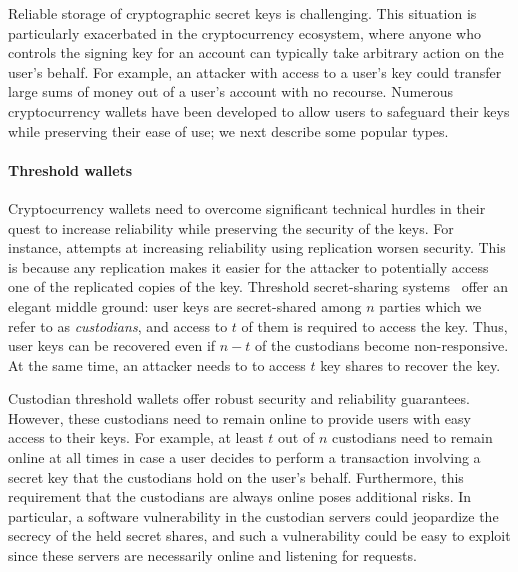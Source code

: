 Reliable storage of cryptographic secret keys is challenging. This situation is particularly exacerbated in the cryptocurrency ecosystem, where anyone who controls the signing key for an account can typically take arbitrary action on the user's behalf. For example, an attacker with access to a user's key could transfer large sums of money out of a user's account with no recourse. Numerous cryptocurrency wallets have been developed to allow users to safeguard their keys while preserving their ease of use; we next describe some popular types.

\paragraph{Threshold wallets} Cryptocurrency wallets need to overcome significant technical hurdles in their quest to increase reliability while preserving the security of the keys.
For instance, attempts at increasing reliability using replication worsen security. This is because any replication makes it easier for the attacker to potentially access one of the replicated copies of the key. Threshold secret-sharing systems~\cite{CACM:Shamir79} offer an elegant middle ground: user keys are secret-shared among $n$ parties which we refer to as \emph{custodians}, and access to $t$ of them is required to access the key. Thus, user keys can be recovered even if $n-t$ of the custodians become non-responsive. At the same time, an attacker needs to to access $t$ key shares to recover the key. 

Custodian threshold wallets offer robust security and reliability guarantees. However, these custodians need to remain online to provide users with easy access to their keys. For example, at least $t$ out of $n$ custodians need to remain online at all times in case a user decides to perform a transaction involving a secret key that the custodians hold on the user's behalf. Furthermore, this requirement that the custodians are always online poses additional risks. In particular, a software vulnerability in the custodian servers could jeopardize the secrecy of the held secret shares, and such a vulnerability could be easy to exploit since these servers are necessarily online and listening for requests. 

